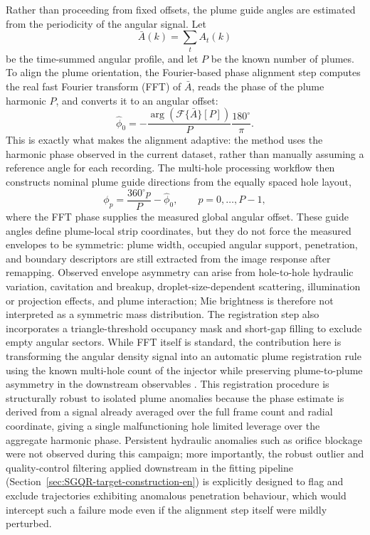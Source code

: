 Rather than proceeding from fixed offsets, the plume guide angles are estimated from the periodicity of the angular signal.
Let
\[
\bar{A}(k)=\sum_t A_t(k)
\]
be the time-summed angular profile, and let \(P\) be the known number of plumes.
To align the plume orientation, the Fourier-based phase alignment step computes the real fast Fourier transform (FFT) of \(\bar{A}\), reads the phase of the plume harmonic \(P\), and converts it to an angular offset:
\[
\hat{\phi}_0
=
-\frac{\arg\!\left(\mathcal{F}\{\bar{A}\}[P]\right)}{P}\frac{180^\circ}{\pi}.
\]
This is exactly what makes the alignment adaptive: the method uses the harmonic phase observed in the current dataset, rather than manually assuming a reference angle for each recording.
The multi-hole processing workflow then constructs nominal plume guide directions from the equally spaced hole layout,
\[
\phi_p=\frac{360^\circ p}{P}-\hat{\phi}_0, \qquad p=0,\dots,P-1,
\]
where the FFT phase supplies the measured global angular offset.
These guide angles define plume-local strip coordinates, but they do not force the measured envelopes to be symmetric: plume width, occupied angular support, penetration, and boundary descriptors are still extracted from the image response after remapping.
Observed envelope asymmetry can arise from hole-to-hole hydraulic variation, cavitation and breakup, droplet-size-dependent scattering, illumination or projection effects, and plume interaction; Mie brightness is therefore not interpreted as a symmetric mass distribution.
The registration step also incorporates a triangle-threshold occupancy mask and short-gap filling to exclude empty angular sectors.
While FFT itself is standard, the contribution here is transforming the angular density signal into an automatic plume registration rule using the known multi-hole count of the injector while preserving plume-to-plume asymmetry in the downstream observables \cite{CooleyTukey1965FFT,Szeliski2011Vision}.
This registration procedure is structurally robust to isolated plume anomalies because the phase estimate is derived from a signal already averaged over the full frame count and radial coordinate, giving a single malfunctioning hole limited leverage over the aggregate harmonic phase. Persistent hydraulic anomalies such as orifice blockage were not observed during this campaign; more importantly, the robust outlier and quality-control filtering applied downstream in the fitting pipeline (Section~\ref{sec:SGQR-target-construction-en}) is explicitly designed to flag and exclude trajectories exhibiting anomalous penetration behaviour, which would intercept such a failure mode even if the alignment step itself were mildly perturbed.

